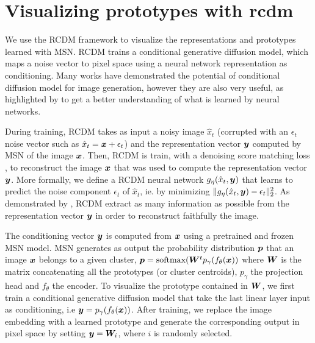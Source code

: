 \documentclass{article} %
\begin{document}
\section{Visualizing prototypes with rcdm}
\label{apndx:rcdm}

We use the RCDM framework \citep{bordes2022high} to visualize the representations and prototypes learned with MSN. RCDM trains a conditional generative diffusion model, which maps a noise vector to pixel space using a neural network representation as conditioning. Many works \citep{dale2, imagen} have demonstrated the potential of conditional diffusion model for image generation, however they are also very useful, as highlighted by \citep{bordes2022high} to get a better understanding of what is learned by neural networks.

During training, RCDM takes as input a noisy image $\hat{x}_{t}$ (corrupted with an $\epsilon_t$ noise vector such as $\hat{x}_{t} = {\bm{x}} + \epsilon_t$) and the representation vector ${\bm{y}}$ computed by MSN of the image ${\bm{x}}$. Then, RCDM is train, with a denoising score matching loss \citep{vincent2011connection, ddpm_2020}, to reconstruct the image ${\bm{x}}$ that was used to compute the representation vector ${\bm{y}}$. More formally, we define a RCDM neural network $g_{\eta}(\hat{x}_{t}, {\bm{y}})$ that learns to predict the noise component $\epsilon_t$ of $\hat{x}_{t}$, ie. by minimizing $\|g_{\eta}(\hat{x}_{t}, {\bm{y}}) - \epsilon_t\|_2^2$. As demonstrated by \citep{bordes2022high}, RCDM extract as many information as possible from the representation vector ${\bm{y}}$ in order to reconstruct faithfully the image.


The conditioning vector ${\bm{y}}$ is computed from ${\bm{x}}$ using a pretrained and frozen MSN model.
MSN generates as output the probability distribution ${\bm{p}}$ that an image ${\bm{x}}$ belongs to a given cluster, ${\bm{p}} =\text{softmax}({\bm{W}}^t p_\gamma(f_\theta({\bm{x}}))$ where ${\bm{W}}$ is the matrix concatenating all the prototypes (or cluster centroids), $p_\gamma$ the projection head and $f_\theta$ the encoder. To visualize the prototype contained in ${\bm{W}}$, we first train a conditional generative diffusion model that take the last linear layer input as conditioning, i.e ${\bm{y}}=p_\gamma(f_\theta({\bm{x}}))$.
After training, we replace the image embedding with a learned prototype and generate the corresponding output in pixel space by setting ${\bm{y}}={\bm{W}}_i$, where $i$ is randomly selected.
\end{document}
